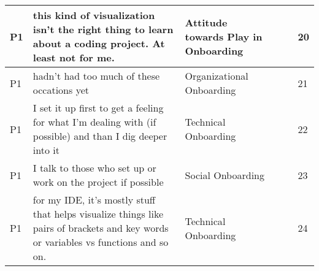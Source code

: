 \begin{appendices}
\begin{landscape}
\begin{longtable}{|p{0.8cm}|p{7cm}|p{3cm}|p{3cm}|p{5.5cm}|p{0.5cm}|}
      P1                   & this kind of visualization isn't the right thing to learn about a coding project. At least not for me.                                                                                                                                                                      & Attitude towards Play in Onboarding      &                                    &                                                                                                                                                    & 20           \\ \hline
      P1                   & hadn't had too much of these occations yet                                                                                                                                                                                                                                  & Organizational Onboarding                &                                    &                                                                                                                                                    & 21           \\ \hline
      P1                   & I set it up first to get a feeling for what I'm dealing with (if possible) and than I dig deeper into it                                                                                                                                                                    & Technical Onboarding                     &                                    &                                                                                                                                                    & 22           \\ \hline
      P1                   & I talk to those who set up or work on the project if possible                                                                                                                                                                                                               & Social Onboarding                        &                                    &                                                                                                                                                    & 23           \\ \hline
      P1                   & for my IDE, it's mostly stuff that helps visualize things like pairs of brackets and key words or variables vs functions and so on.                                                                                                                                         & Technical Onboarding                     &                                    &                                                                                                                                                    & 24           \\ \hline

\end{longtable}
\end{landscape}
\end{appendices}
